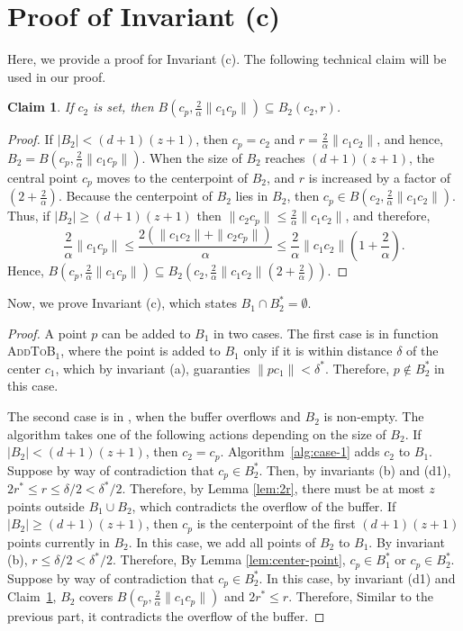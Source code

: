 \documentclass[envcountsame]{cls/cccg15}
\newcommand{\rc}{r}
\newcommand{\cp}{c_p}
\newcommand{\dz}{(d + 1)(z + 1)}
\newtheorem{claim}{Claim}
\newcommand{\textproc}{\textsc}
\newcommand{\len}[1]{\|{#1}\|}
\newcommand{\radius}[1]{\frac{2}{\alpha} \len{c_1 #1}}
\newcommand{\lee}{\leqslant}
\newcommand{\gee}{\geqslant}
\renewcommand{\leq}{\lee}
\renewcommand{\geq}{\gee}
\renewcommand{\ge}{\gee}
\begin{document}
\section{Proof of Invariant (c)}
\label{app:inv-c}

Here, we provide a proof for Invariant (c).
The following technical claim will be used in our proof.

\begin{claim}
	\label{claim:c}
	If $c_2$ is set, then
	$B(c_p, \radius{c_p}) \subseteq B_2(c_2, r)$.
\end{claim}

\begin{proof}
If $|B_2| < \dz$, then $c_p = c_2$ and $r = \radius{c_2}$, 
and hence, $B_2 = B(c_p, \radius{c_p})$. 
When the size of $B_2$ reaches $\dz$, 
the central point $\cp$ moves to the centerpoint of $B_2$,
and $\rc$ is increased by a factor of $(2 + \frac{2}{\alpha})$. 
Because the centerpoint of $B_2$ lies in $B_2$, then $c_p \in B(c_2, \radius{c_2})$.
Thus, if $|B_2| \ge \dz$ then $\len{c_2 c_p} \leq \radius{c_2}$, and therefore,
$$
	\radius{c_p} \leq \frac{2 (\len{c_1 c_2} + \len{c_2 c_p})}{\alpha} \leq \radius{c_2}(1 + \frac{2}{\alpha}).
$$ 
Hence, $B(c_p, \radius{c_p}) \subseteq B_2(c_2, \radius{c_2}(2 + \frac{2}{\alpha}))$.
\end{proof}

\noindent
Now, we prove Invariant (c),
which states $B_1 \cap B_2^* = \emptyset$.

\begin{proof}
A point $p$ can be added to $B_1$ in two cases. %
The first case is in function \textproc{AddToB$_1$}, 
where the point is added to $B_1$ only if it is within distance $\delta$ of the center $c_1$,  
which by invariant (a), 
guaranties $\len{pc_1} < \delta^*$. 
Therefore, $p \not \in B_2^*$ in this case.

The second case is in , when the buffer overflows and $B_2$ is non-empty.
The algorithm takes one of the following actions depending on the size of $B_2$.
If $|B_2| < \dz $, then $c_2 = c_p$.
Algorithm~\ref{alg:case-1} adds $c_2$ to $B_1$.
Suppose by way of contradiction that $c_p \in B_2^*$.
Then, by invariants (b) and (d1), 
$2r^* \leq r \leq \delta/2 < \delta^*/2$. 
Therefore, by Lemma \ref{lem:2r}, there must be at most $z$ points outside $B_1 \cup B_2$,
which contradicts the overflow of the buffer. 
If $|B_2| \geq \dz$, then $c_p$ is the centerpoint of the first $\dz$ points currently in $B_2$. 
In this case, we add all points of $B_2$ to $B_1$. 
By invariant (b), $r \leq \delta/2 < \delta^*/2$. 
Therefore, By Lemma \ref{lem:center-point}, $c_p \in B_1^*$ or $c_p \in B_2^*$. 
Suppose by way of contradiction that $c_p \in B_2^*$. 
In this case, by invariant (d1) and Claim~\ref{claim:c}, %
$B_2$ covers $B(c_p, \radius{c_p})$ and $2r^* \leq r$. 
Therefore, Similar to the previous part, it contradicts the overflow of the buffer. 
\end{proof}
\end{document}
